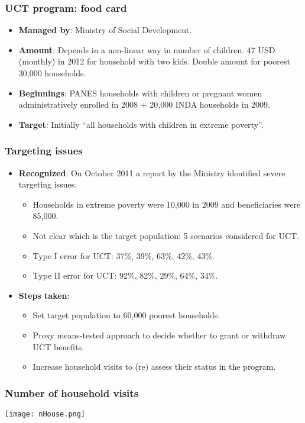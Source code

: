 \documentclass{beamer}
\begin{document}
\begin{frame}
\frametitle{UCT program: food card}
\begin{itemize}
\item \textbf{Managed by}: Ministry of Social Development.
\item \textbf{Amount}: Depends in a non-linear way in number of children. 47 USD (monthly) in 2012 for household with two kids. Double amount for poorest 30,000 households.
\item \textbf{Beginnings}: PANES households with children or pregnant women administratively enrolled in 2008 + 20,000 INDA households in 2009.
\item \textbf{Target}: Initially ``all households with children in extreme poverty''.		
\end{itemize}
\end{frame}

\begin{frame}
\frametitle{Targeting issues}
\begin{itemize}
\item \textbf{Recognized}: On October 2011 a report by the Ministry identified severe targeting issues.
\begin{itemize}
\item Households in extreme poverty were 10,000 in 2009 and beneficiaries were 85,000.
\item Not clear which is the target population: 5 scenarios considered for UCT.
\item Type I error for UCT: 37\%, 39\%, 63\%, 42\%, 43\%.
\item Type II error for UCT: 92\%, 82\%, 29\%, 64\%, 34\%.
\end{itemize}
\item \textbf{Steps taken}:
\begin{itemize}
\item Set target population to 60,000 poorest households.
\item Proxy means-tested approach to decide whether to grant or withdraw UCT benefits.
\item Increase household visits to (re) assess their status in the program.
\end{itemize}	
\end{itemize}
\end{frame}

\begin{frame}
\frametitle{Number of household visits}
\begin{center}
\texttt{[image: nHouse.png]}
\label{nHouse}
\end{center}
\end{frame}
\end{document}
